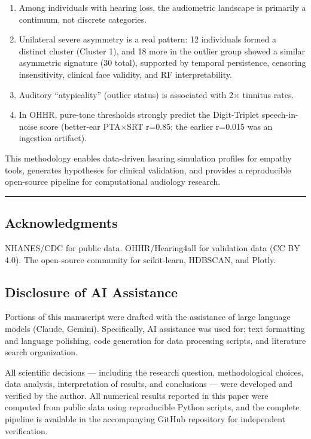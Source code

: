 \documentclass[
]{article}
\providecommand{\tightlist}{%
  \setlength{\itemsep}{0pt}\setlength{\parskip}{0pt}}
\begin{document}
\begin{enumerate}
\def\labelenumi{\arabic{enumi}.}
\tightlist
\item
  Among individuals with hearing loss, the audiometric landscape is primarily a
  continuum, not discrete categories.
\item
  Unilateral severe asymmetry is a real pattern: 12 individuals formed a
  distinct cluster (Cluster 1), and 18 more in the outlier group showed a
  similar asymmetric signature (30 total), supported by temporal persistence,
  censoring insensitivity, clinical face validity, and RF interpretability.
\item
  Auditory ``atypicality'' (outlier status) is associated with 2× tinnitus
  rates.
\item
  In OHHR, pure-tone thresholds strongly predict the Digit-Triplet
  speech-in-noise score (better-ear PTA×SRT r=0.85; the earlier r=0.015 was an
  ingestion artifact).
\end{enumerate}

This methodology enables data-driven hearing simulation profiles for empathy
tools, generates hypotheses for clinical validation, and provides a reproducible
open-source pipeline for computational audiology research.

\begin{center}\rule{0.5\linewidth}{0.5pt}\end{center}

\subsection{Acknowledgments}\label{acknowledgments}

NHANES/CDC for public data. OHHR/Hearing4all for validation data (CC BY 4.0).
The open-source community for scikit-learn, HDBSCAN, and Plotly.

\subsection{Disclosure of AI Assistance}\label{disclosure-of-ai-assistance}

Portions of this manuscript were drafted with the assistance of large language
models (Claude, Gemini). Specifically, AI assistance was used for: text
formatting and language polishing, code generation for data processing scripts,
and literature search organization.

All scientific decisions --- including the research question, methodological
choices, data analysis, interpretation of results, and conclusions --- were
developed and verified by the author. All numerical results reported in this
paper were computed from public data using reproducible Python scripts, and the
complete pipeline is available in the accompanying GitHub repository for
independent verification.
\end{document}

